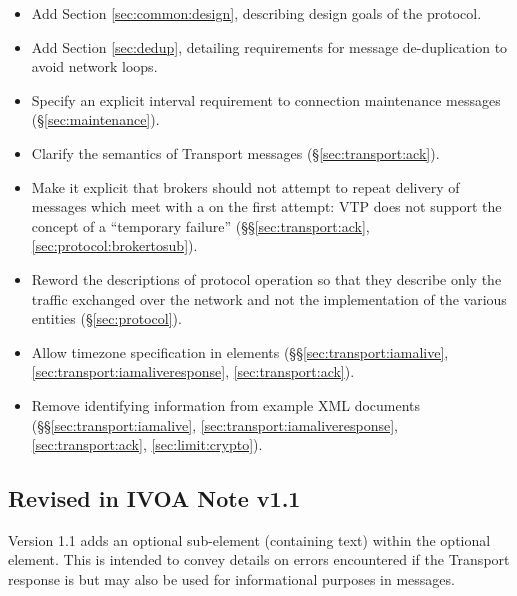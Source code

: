 \documentclass[a4paper,11pt]{ivoa}
\begin{document}
\begin{itemize}

    \item{Add Section \ref{sec:common:design}, describing design goals of the
    protocol.}

    \item{Add Section \ref{sec:dedup}, detailing requirements for message
    de-duplication to avoid network loops.}

    \item{Specify an explicit interval requirement to connection maintenance
    messages (\S\ref{sec:maintenance}).}

    \item{Clarify the semantics of  Transport messages
    (\S\ref{sec:transport:ack}).}

    \item{Make it explicit that brokers should not attempt to repeat delivery
    of messages which meet with a  on the first attempt: VTP does
    not support the concept of a ``temporary failure''
    (\S\S\ref{sec:transport:ack}, \ref{sec:protocol:brokertosub}).}

    \item{Reword the descriptions of protocol operation so that they describe
    only the traffic exchanged over the network and not the implementation of
    the various entities (\S\ref{sec:protocol}).}

    \item{Allow timezone specification in 
     elements (\S\S\ref{sec:transport:iamalive},
    \ref{sec:transport:iamaliveresponse}, \ref{sec:transport:ack}).}

    \item{Remove identifying information from example XML documents
    (\S\S\ref{sec:transport:iamalive}, \ref{sec:transport:iamaliveresponse},
    \ref{sec:transport:ack}, \ref{sec:limit:crypto}).}

\end{itemize}

\subsection{Revised in IVOA Note v1.1}

Version 1.1 adds an optional  sub-element (containing text)
within the optional  element. This is intended to convey
details on errors encountered if the Transport response is  but
may also be used for informational purposes in  messages.


\end{document}
